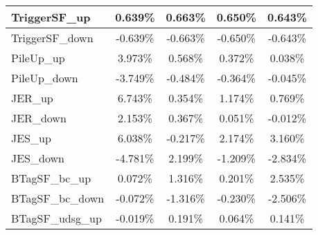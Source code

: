 \begin{table}[]
{\begin{tabular}{|l|c|c|c|c|}
TriggerSF\_up                               & 0.639\%                                & 0.663\%                                & 0.650\%                               & 0.643\%                                \\ \hline
TriggerSF\_down                             & -0.639\%                              & -0.663\%                              & -0.650\%                             & -0.643\%                              \\ \hline
PileUp\_up                             & 3.973\%                              & 0.568\%                              & 0.372\%                             & 0.038\%                              \\ \hline
PileUp\_down                           & -3.749\%                            & -0.484\%                            & -0.364\%                           & -0.045\%                            \\ \hline
JER\_up                         & 6.743\%                          & 0.354\%                          & 1.174\%                         & 0.769\%                          \\ \hline
JER\_down                       & 2.153\%                        & 0.367\%                        & 0.051\%                       & -0.012\%                        \\ \hline
JES\_up                                 & 6.038\%                                  & -0.217\%                                  & 2.174\%                                 & 3.160\%                                  \\ \hline
JES\_down                               & -4.781\%                                & 2.199\%                                & -1.209\%                               & -2.834\%                                \\ \hline
BTagSF\_bc\_up                              & 0.072\%                               & 1.316\%                               & 0.201\%                              & 2.535\%                               \\ \hline
BTagSF\_bc\_down                            & -0.072\%                             & -1.316\%                             & -0.230\%                            & -2.506\%                             \\ \hline
BTagSF\_udsg\_up                            & -0.019\%                             & 0.191\%                             & 0.064\%                            & 0.141\%                             \\ \hline

\end{tabular}}
\end{table}
